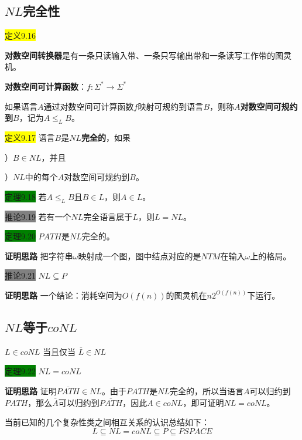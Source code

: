 \documentclass[a4paper]{article}
\begin{document}
\subsection{$NL$完全性}

	\colorbox{yellow}{定义9.16} 
	
		\qquad \textbf{对数空间转换器}是有一条只读输入带、一条只写输出带和一条读写工作带的图灵机。

		\qquad \textbf{对数空间可计算函数}：$f:\Sigma^* \rightarrow \Sigma^*$
		
		\qquad 如果语言$A$通过对数空间可计算函数$f$映射可规约到语言$B$，则称\textbf{$A$对数空间可规约到$B$}，记为$A\leq_L B$。
		
	\colorbox{yellow}{定义9.17} 语言$B$是\textbf{$NL$完全的}，如果
	
		）$B \in NL$，并且
		
		）$NL$中的每个$A$对数空间可规约到$B$。

	\colorbox{green}{定理9.18} 若$A\leq_L B$且$B\in L$，则$A\in L$。

	\colorbox{gray}{推论9.19} 若有一个$NL$完全语言属于$L$，则$L=NL$。

	\colorbox{green}{定理9.20} $PATH$是$NL$完全的。
	
	\textbf{证明思路} \quad 把字符串$\omega$映射成一个图，图中结点对应的是$NTM$在输入$\omega$上的格局。

	\colorbox{gray}{推论9.21} $NL\subseteq P$
	
	\textbf{证明思路} \quad 一个结论：消耗空间为$O(f(n))$的图灵机在$n2^{O(f(n))}$下运行。

\subsection{$NL$等于$coNL$}

	$L\in coNL$ 当且仅当 $\overline{L} \in NL$

	\colorbox{green}{定理9.22} $NL=coNL$

	\textbf{证明思路} \quad 证明$\overline{PATH} \in NL$。由于$PATH$是$NL$完全的，所以当语言$A$可以归约到$PATH$，那么$\overline{A}$可以归约到$\overline{PATH}$，因此$A \in coNL$，即可证明$NL=coNL$。
	
	当前已知的几个复杂性类之间相互关系的认识总结如下：
	$$ L \subseteq NL = coNL \subseteq P \subseteq PSPACE $$
\end{document}
